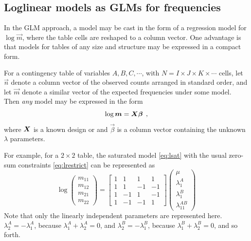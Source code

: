 \documentclass[11pt]{book}\usepackage[]{graphicx}\usepackage[]{color}
\begin{document}
\subsection{Loglinear models as GLMs for frequencies}\label{sec:loglin-glms}
In the GLM approach, a \loglin model may be cast in the form of a regression
model for $\log \vec{m}$, where the table cells are reshaped to a
column vector.
One advantage is that models for tables of any size and structure
may be expressed in a compact form.

For a contingency table of variables $A, B, C,\cdots $, with $N=I\times
J\times K\times \cdots $ cells, let $\vec{n}$ denote a column vector of
the observed counts arranged in standard order, and let $\vec{m}$ denote
a similar vector of the expected frequencies under some model. Then \emph{any}
\loglin model may be expressed
in the form
\begin{equation*}
 \log \bm{m} = \bm{X}\bm{\beta}
 \:\: ,
\end{equation*}
where $\bm{X}$ is a known design or  and $\vec{\beta}$ is a
column vector containing the unknown $\lambda $ parameters.

For example, for
a $2\times 2$ table, the saturated model \eqref{eq:lsat} with the usual zero-sum constraints \eqref{eq:lrestrict}
can be represented as
\begin{equation*}
\log \left(
\begin{array}{c}
 m_{11} \\
 m_{12} \\
 m_{21} \\
 m_{22}
\end{array}
\right) =\left[
\begin{array}{rrrr}
1 & 1 & 1 & 1 \\
1 & 1 & -1 & -1 \\
1 & -1 & 1 & -1 \\
1 & -1 & -1 & 1
\end{array}
\right] \left(
\begin{array}{c}
\mu  \\
\lambda _1^A \\
\lambda _1^B \\
\lambda _{11}^{AB}
\end{array}
\right)
\end{equation*}
Note that only the linearly independent parameters are represented here.
$\lambda_2^A = - \lambda_1^A$, because $\lambda_1^A + \lambda_2^A =0$, and
$\lambda_2^B = - \lambda_1^B$, because $\lambda_1^B + \lambda_2^B =0$,
and so forth.
\end{document}
